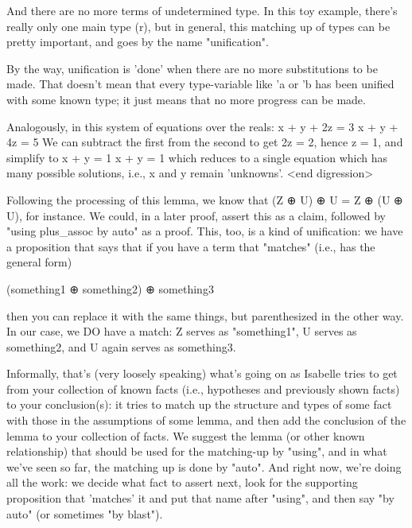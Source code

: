 And there are no more terms of undetermined type. In this toy example, there's really only one main type (r), but in general, this matching up of types can be pretty important, and goes by the name "unification". 

By the way, unification is 'done' when there are no more substitutions to be made. That doesn't mean that every type-variable like 'a or 'b has been unified with some known type; it just means that no more progress can be made. 

Analogously, in this system of equations over the reals:
x + y + 2z = 3
x + y + 4z = 5
We can subtract the first from the second to get 2z = 2, hence z = 1, and simplify to 
x + y = 1
x + y = 1
which reduces to a single equation which has many possible solutions, i.e., x and y remain 'unknowns'. 
 <end digression> 

Following the processing of this lemma, we know that (Z ⊕ U) ⊕ U = Z ⊕  (U ⊕ U), for instance. We could, in a later proof, assert this as a claim, followed by "using plus_assoc by auto" as a proof. This, too, is a kind of unification: we have a proposition that says that if you have a term that "matches" (i.e., has the general form) 

   (something1  ⊕ something2)  ⊕ something3

then you can replace it with the same things, but parenthesized in the other way. In our case, we DO have a match: Z serves as "something1", U serves as something2, and U again serves as something3. 

Informally, that's (very loosely speaking) what's going on as Isabelle tries to get from your collection of known facts (i.e., hypotheses and previously shown facts) to your conclusion(s): it tries to match up the structure and types of some fact with those in the assumptions of some lemma, and then add the conclusion of the lemma to your collection of facts. We suggest the lemma (or other known relationship) that should be used for the matching-up by "using", and in what we've seen so far, the matching up is done by "auto". And right now, we're doing all the work: we decide what fact to assert next, look for the supporting proposition that 'matches' it and put that name after "using", and then say "by auto" (or sometimes "by blast"). 

